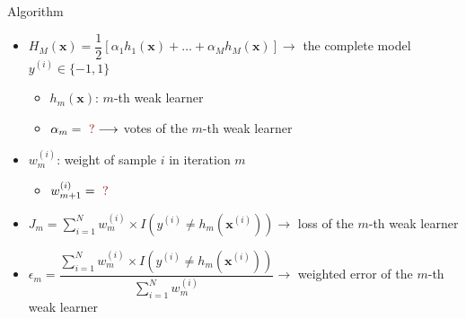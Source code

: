 \documentclass[serif, aspectratio=169]{beamer}
\begin{document}
\begin{frame}{Algorithm}
    \begin{itemize}
        \itemsep1em
        \justifying
        \item $H_M(\boldsymbol{x}) = \dfrac{1}{2}[\alpha_1h_1(\boldsymbol{x})+\dots+\alpha_Mh_M(\boldsymbol{x})] \longrightarrow$ the complete model \hfill $y^{(i)} \in \{-1, 1\}$
        \smallskip
        \begin{itemize}
            \itemsep0.5em
            \item $h_m(\boldsymbol{x})$: $m$-th weak learner
            \item $\alpha_m = \ \textcolor{deepred}{?} \longrightarrow$ votes of the $m$-th weak learner
        \end{itemize}
        \item $w_m^{(i)}$: weight of sample $i$ in iteration $m$
        \smallskip
        \begin{itemize}
            \item $w_{m+1}^{(i)} = \ \textcolor{deepred}{?}$
        \end{itemize}
        \item $J_m = \displaystyle\sum_{i=1}^N w_m^{(i)} \times I(y^{(i)} \neq h_m(\boldsymbol{x}^{(i)})) \longrightarrow$ loss of the $m$-th weak learner
        \item $\epsilon_m = \dfrac{\sum_{i=1}^N w_m^{(i)} \times I(y^{(i)} \neq h_m(\boldsymbol{x}^{(i)}))}{\sum_{i=1}^N w_m^{(i)}} \longrightarrow$ weighted error of the $m$-th weak learner
    \end{itemize}
\end{frame}
\end{document}

